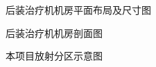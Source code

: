 \begin{figure}[H]
\centering
{}
\caption{后装治疗机机房平面布局及尺寸图}
\label{fig:ch4-room-plan}
\end{figure}

\begin{figure}[H]
\centering
{}
\caption{后装治疗机机房剖面图}
\label{fig:ch4-room-section}
\end{figure}

\begin{figure}[H]
\centering
{}
\caption{本项目放射分区示意图}
\label{fig:ch4-zoning}
\end{figure}
